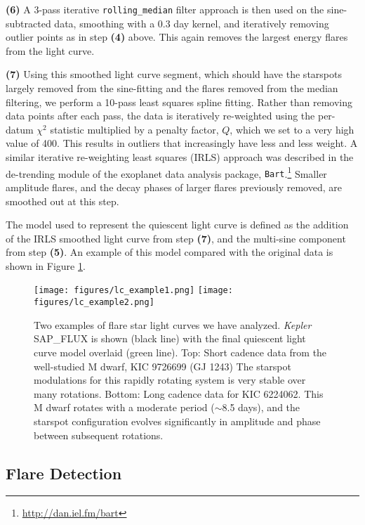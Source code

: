 \documentclass[twocolumn]{aastex6}
\newcommand{\Kepler}{\textsl{Kepler}\xspace}
\begin{document}
{\bf (6)} A 3-pass iterative {\tt rolling\_median} filter approach is then used on the sine-subtracted data, smoothing with a 0.3 day kernel, and iteratively removing outlier points as in step {\bf (4)} above. This again removes the largest energy flares from the light curve.

{\bf (7)} Using this smoothed light curve segment, which should have the starspots largely removed from the sine-fitting and the flares removed from the median filtering, we perform a 10-pass least squares spline fitting. Rather than removing data points after each pass, the data is iteratively re-weighted \citep[e.g. see][]{green1984} using the per-datum $\chi^2$ statistic multiplied by a penalty factor, $Q$, which we set to a very high value of 400. This results in outliers that increasingly have less and less weight. A similar iterative re-weighting least squares (IRLS) approach was described in the de-trending module of the exoplanet data analysis package, {\tt Bart}.\footnote{\url{http://dan.iel.fm/bart}} Smaller amplitude flares, and the decay phases of larger flares previously removed, are smoothed out at this step.

The model used to represent the quiescent light curve is defined as the addition of the IRLS smoothed light curve from step {\bf (7)}, and the multi-sine component from step {\bf (5)}. An example of this model compared with the original data is shown in Figure \ref{fig:lc}.



\begin{figure}[!t]
\centering
\texttt{[image: figures/lc\_example1.png]}
\texttt{[image: figures/lc\_example2.png]}
\caption{
Two examples of flare star light curves we have analyzed. \Kepler SAP\_FLUX is shown (black line) with the final quiescent light curve model overlaid (green line). Top: Short cadence data from the well-studied M dwarf, KIC 9726699 (GJ 1243) The starspot modulations for this rapidly rotating system is very stable over many rotations. Bottom: Long cadence data for KIC 6224062. This M dwarf rotates with a moderate period ($\sim$8.5 days), and the starspot configuration evolves significantly in amplitude and phase between subsequent rotations.
}
\label{fig:lc}
\end{figure}



\subsection{Flare Detection}
\label{sec:find2}
\end{document}
